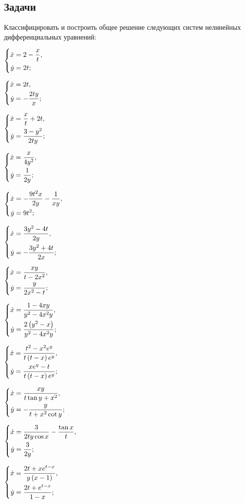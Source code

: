 \subsection{Задачи}

	Классифицировать и построить общее решение следующих систем нелинейных дифференциальных уравнений:
	\begin{multicols}{3}
		\begin{enumtasks}

			\label{nonlinsys_systodes:systems2}
			\item \( \left\lbrace \begin{aligned}  \dot{x} &= 2 - \frac{x}{t}, \\ \dot{y} &= 2t;  \end{aligned} \right. \) %
			\item \( \left\lbrace \begin{aligned}  \dot{x} &= 2t, \\ \dot{y} &= - \frac{2 t y}{x};  \end{aligned} \right. \) %
			\item \( \left\lbrace \begin{aligned}  \dot{x} &= \frac{x}{t} + 2t, \\ \dot{y} &= \frac{3 - y^2}{2ty};  \end{aligned} \right. \) %
			\item \( \left\lbrace \begin{aligned}  \dot{x} &= \frac{x}{4y^2}, \\ \dot{y} &= \frac{1}{2y};  \end{aligned} \right. \) %
			\item \( \left\lbrace \begin{aligned}  \dot{x} &= - \frac{9t^2 x}{2y} - \frac{1}{xy}, \\ \dot{y} &= 9t^2;  \end{aligned} \right. \) %
			\item \( \left\lbrace \begin{aligned}  \dot{x} &= \frac{3y^2 - 4t}{2y}, \\ \dot{y} &= -\frac{3y^2 + 4t}{2x};  \end{aligned} \right. \) %
			\item \( \left\lbrace \begin{aligned}  \dot{x} &= \frac{x y}{t - 2 x^2}, \\ \dot{y} &= \frac{y}{2 x^2 - t};  \end{aligned} \right. \) %
			\item \( \left\lbrace \begin{aligned}  \dot{x} &= \frac{1 - 4xy}{y^2 - 4 x^2 y}, \\ \dot{y} &= \frac{2 \left( y^2 - x \right)}{y^2 - 4 x^2 y};  \end{aligned} \right. \) %
			
			\label{nonlinsys_systodes:systems2_hard}
			\item \( \left\lbrace \begin{aligned}  \dot{x} &= \frac{t^2 - x^2 e^y}{t \left( t - x \right) e^y}, \\ \dot{y} &= \frac{x e^{y} - t}{t \left( t - x \right) e^y};  \end{aligned} \right. \) %
			\item \( \left\lbrace \begin{aligned}  \dot{x} &= \frac{xy}{t \tan{y} + x^2}, \\ \dot{y} &= - \frac{y}{t + x^2 \cot{y}};  \end{aligned} \right. \) %
			\item \( \left\lbrace \begin{aligned}  \dot{x} &= \frac{3}{2ty \cos{x}} - \frac{\tan{x}}{t}, \\ \dot{y} &= \frac{3}{2 y};  \end{aligned} \right. \) %
			\item \( \left\lbrace \begin{aligned}  \dot{x} &= \frac{2 t + x e^{t - x}}{y \left(x - 1\right)}, \\ \dot{y} &= \frac{2t + e^{t - x}}{1 - x};  \end{aligned} \right. \) %

		\end{enumtasks}
	\end{multicols}

